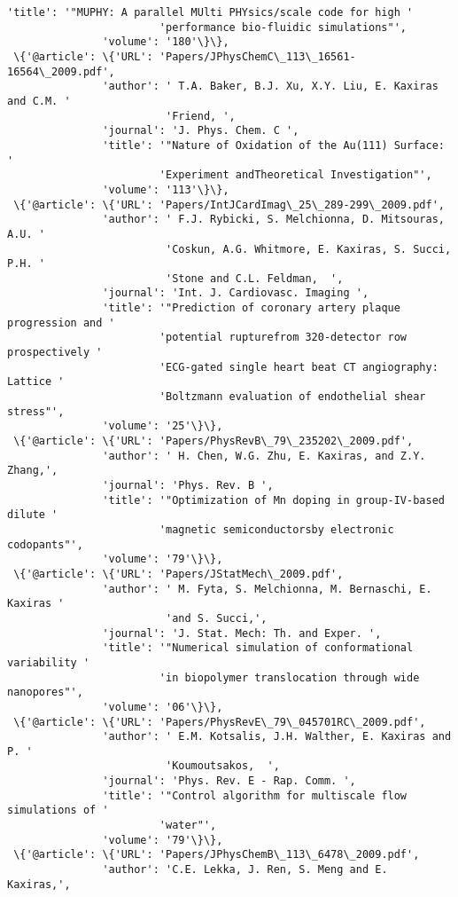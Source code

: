 \documentclass[11pt]{article}
\begin{document}
\begin{Verbatim}[commandchars=\\\{\}]
               'title': '"MUPHY: A parallel MUlti PHYsics/scale code for high '
                        'performance bio-fluidic simulations"',
               'volume': '180'\}\},
 \{'@article': \{'URL': 'Papers/JPhysChemC\_113\_16561-16564\_2009.pdf',
               'author': ' T.A. Baker, B.J. Xu, X.Y. Liu, E. Kaxiras and C.M. '
                         'Friend, ',
               'journal': 'J. Phys. Chem. C ',
               'title': '"Nature of Oxidation of the Au(111) Surface: '
                        'Experiment andTheoretical Investigation"',
               'volume': '113'\}\},
 \{'@article': \{'URL': 'Papers/IntJCardImag\_25\_289-299\_2009.pdf',
               'author': ' F.J. Rybicki, S. Melchionna, D. Mitsouras, A.U. '
                         'Coskun, A.G. Whitmore, E. Kaxiras, S. Succi, P.H. '
                         'Stone and C.L. Feldman,  ',
               'journal': 'Int. J. Cardiovasc. Imaging ',
               'title': '"Prediction of coronary artery plaque progression and '
                        'potential rupturefrom 320-detector row prospectively '
                        'ECG-gated single heart beat CT angiography: Lattice '
                        'Boltzmann evaluation of endothelial shear stress"',
               'volume': '25'\}\},
 \{'@article': \{'URL': 'Papers/PhysRevB\_79\_235202\_2009.pdf',
               'author': ' H. Chen, W.G. Zhu, E. Kaxiras, and Z.Y. Zhang,',
               'journal': 'Phys. Rev. B ',
               'title': '"Optimization of Mn doping in group-IV-based dilute '
                        'magnetic semiconductorsby electronic codopants"',
               'volume': '79'\}\},
 \{'@article': \{'URL': 'Papers/JStatMech\_2009.pdf',
               'author': ' M. Fyta, S. Melchionna, M. Bernaschi, E. Kaxiras '
                         'and S. Succi,',
               'journal': 'J. Stat. Mech: Th. and Exper. ',
               'title': '"Numerical simulation of conformational variability '
                        'in biopolymer translocation through wide nanopores"',
               'volume': '06'\}\},
 \{'@article': \{'URL': 'Papers/PhysRevE\_79\_045701RC\_2009.pdf',
               'author': ' E.M. Kotsalis, J.H. Walther, E. Kaxiras and P. '
                         'Koumoutsakos,  ',
               'journal': 'Phys. Rev. E - Rap. Comm. ',
               'title': '"Control algorithm for multiscale flow simulations of '
                        'water"',
               'volume': '79'\}\},
 \{'@article': \{'URL': 'Papers/JPhysChemB\_113\_6478\_2009.pdf',
               'author': 'C.E. Lekka, J. Ren, S. Meng and E. Kaxiras,',

\end{Verbatim}
\end{document}

